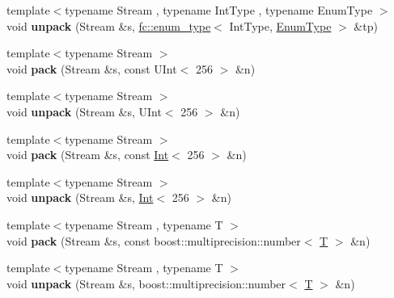 \begin{DoxyCompactItemize}
\item 
\mbox{\label{namespacefc_1_1raw_a1b6856fecc88663223d4bfe562d25545}} 
{\footnotesize template$<$typename Stream , typename Int\+Type , typename Enum\+Type $>$ }\\void {\bfseries unpack} (Stream \&s, \mbox{\hyperlink{classfc_1_1enum__type}{fc\+::enum\+\_\+type}}$<$ Int\+Type, \mbox{\hyperlink{struct_enum_type}{Enum\+Type}} $>$ \&tp)
\item 
\mbox{\label{namespacefc_1_1raw_abf02a09fcbd9c5b30a4c74d413f45bd7}} 
{\footnotesize template$<$typename Stream $>$ }\\void {\bfseries pack} (Stream \&s, const U\+Int$<$ 256 $>$ \&n)
\item 
\mbox{\label{namespacefc_1_1raw_a5f96cd55aede6702820693ebeeaa4527}} 
{\footnotesize template$<$typename Stream $>$ }\\void {\bfseries unpack} (Stream \&s, U\+Int$<$ 256 $>$ \&n)
\item 
\mbox{\label{namespacefc_1_1raw_aac5d821c12e5efa2eca3ab53e9b2db70}} 
{\footnotesize template$<$typename Stream $>$ }\\void {\bfseries pack} (Stream \&s, const \mbox{\hyperlink{struct_int}{Int}}$<$ 256 $>$ \&n)
\item 
\mbox{\label{namespacefc_1_1raw_a910557251249394283f44e86cb58418a}} 
{\footnotesize template$<$typename Stream $>$ }\\void {\bfseries unpack} (Stream \&s, \mbox{\hyperlink{struct_int}{Int}}$<$ 256 $>$ \&n)
\item 
\mbox{\label{namespacefc_1_1raw_a9ba7776492502ec661bd2af8d23e58fb}} 
{\footnotesize template$<$typename Stream , typename T $>$ }\\void {\bfseries pack} (Stream \&s, const boost\+::multiprecision\+::number$<$ \mbox{\hyperlink{struct_t}{T}} $>$ \&n)
\item 
\mbox{\label{namespacefc_1_1raw_a47225fe00eab6981344f74bd49aff774}} 
{\footnotesize template$<$typename Stream , typename T $>$ }\\void {\bfseries unpack} (Stream \&s, boost\+::multiprecision\+::number$<$ \mbox{\hyperlink{struct_t}{T}} $>$ \&n)

\end{DoxyCompactItemize}
